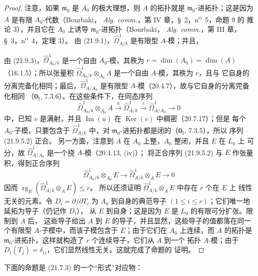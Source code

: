 \begin{proof}
注意，如果 $\mathfrak m_0$ 是 $A_0$ 的极大理想，则 $A$ 的拓扑就是
$\mathfrak m_0$-进拓扑；这是因为 $A$ 是有限 $A_0$-代数（Bourbaki，
\emph{Alg. comm.}，第 IV 章，\S~2，n\textsuperscript{o}~5，命题 9 的
推论 3），并且它在 $A_0$ 上诱导 $\mathfrak m_0$-进拓扑（Bourbaki，
\emph{Alg. comm.}，第 III 章，\S~3，n\textsuperscript{o}~4，定理 3）。
由 (21.9.1)，$\widehat\Omega^1_{A/k}$ 是有限型 $A$-模；并且，

由 (21.9.3)，$\widehat\Omega^1_{A_0/k}$ 是一个自由 $A_0$-模，其秩为
$r=\dim(A_0)=\dim(A)$（16.1.5）；所以张量积
$\widehat\Omega^1_{A_0/k}\otimes_{A_0}A$ 是一个自由 $A$-模，其秩为 $r$，且与
它自身的分离完备化相同；最后，$\widehat\Omega^1_{A/A_0}$ 是有限型
$A$-模（20.4.7），故与它自身的分离完备化相同
（$\mathbf 0_{\mathrm I}$, 7.3.6）。在这些条件下，在同态序列
\begin{equation}
\tag{21.9.5.2}
\label{0.21.9.5.2-fr}
  \widehat\Omega^1_{A_0/k}\otimes_{A_0}A
  \xrightarrow{u}\widehat\Omega^1_{A/k}
  \xrightarrow{v}\widehat\Omega^1_{A/A_0}\longrightarrow0
\end{equation}
中，已知 $v$ 是满射，并且 $\operatorname{Im}(u)$ 在
$\operatorname{Ker}(v)$ 中稠密（20.7.17）；但是
每个 $A_0$-子模，只要包含于 $\widehat\Omega^1_{A/k}$ 中，对
$\mathfrak m_0$-进拓扑都是闭的（$\mathbf 0_{\mathrm I}$, 7.3.5），所以
序列 (21.9.5.2) 正合。
另一方面，注意到 $A$ 在 $A_0$ 上整，$A_0$ 整闭，并且 $E$ 在 $L_0$ 上
可分，故 $\widehat\Omega^1_{A/A_0}$ 是一个挠 $A$-模（20.4.13, (iv)）；
将正合序列 (21.9.5.2) 与 $E$ 作张量积，得到正合序列
\[
  \widehat\Omega^1_{A_0/k}\otimes_{A_0}E
  \longrightarrow \widehat\Omega^1_{A/k}\otimes_AE\longrightarrow0
\]
因而 $\operatorname{rg}_E(\widehat\Omega^1_{A/k}\otimes_AE)\leqslant r$。
所以还须证明 $\widehat\Omega^1_{A/k}\otimes_AE$ 中存在 $r$ 个在 $E$ 上
线性无关的元素。令 $D_i=\partial/\partial T_i$ 为 $A_0$ 到自身的典范导子
$(1\leqslant i\leqslant r)$；它们唯一地延拓为导子（仍记作 $D_i$），
从 $E$ 到自身；这是因为 $E$ 是 $L_0$ 的有限可分扩张。限制到 $A$ 后，
这些导子给出 $A$ 到 $E$ 的导子，并且显然，这些导子的值都落在同一个有限型
$A$-子模中，而该子模包含于 $E$；由于它们在 $A_0$ 上连续，而 $A$ 的拓扑是
$\mathfrak m_0$-进拓扑，这样就构造了 $r$ 个连续导子，它们从 $A$ 到一个
拓扑 $A$-模；由于 $D_i(T_j)=\delta_{ij}$，它们显然线性无关。这就完成了命题的
证明。
\end{proof}

下面的命题是 (21.7.3) 的一个“形式”对应物：

